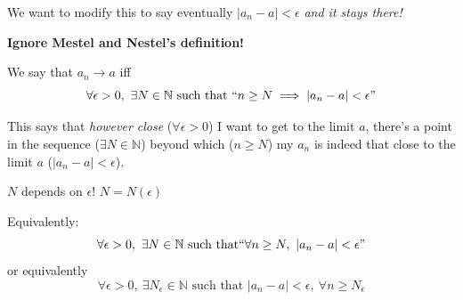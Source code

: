 \documentclass[10pt,twoside]{scrartcl}
\begin{document}
We want to modify this to say eventually $|a_n - a| < \epsilon$ \emph{and it stays there!}\vspace*{10pt}

\textbf{Ignore Mestel and Nestel's definition!}\\

\begin{definition}[Convergence]
We say that $a_n \to a$ iff 
\[\forall \epsilon >0,~\exists N \in \mathbb{N} \text{ such that } ``n \geq N \implies |a_n - a| < \epsilon"\]	
\end{definition}

This says that \emph{however close} ($\forall \epsilon>0$) I want to get to the limit $a$, there's a point in the sequence ($\exists N \in \mathbb{N}$) beyond which ($n \geq N$) my $a_n$ is indeed that close to the limit $a$ ($|a_n - a| <\epsilon$).\\ 

\begin{remark}
$N$ depends on $\epsilon$! $N = N(\epsilon)$	
\end{remark}

Equivalently:
\[\forall \epsilon >0,~ \exists N \in \mathbb{N} \text{ such that} ``\forall n \geq N,~|a_n -a|<\epsilon"\]
or equivalently
\[\forall \epsilon >0,~\exists N_\epsilon\in\mathbb{N} \text{ such that } |a_n - a| < \epsilon,~\forall n \geq N_\epsilon\]\vspace*{5pt}
\end{document}
